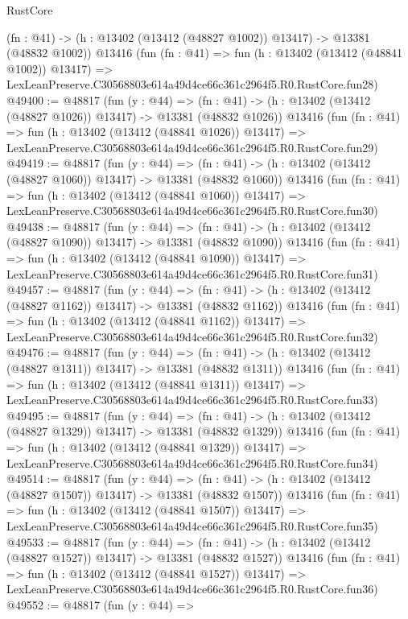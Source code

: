 \begin{lexlean}{RustCore}
\begin{coremodule}
    (fn : @41) -> (h : @13402 (@13412 (@48827 @1002)) @13417) -> @13381 (@48832 @1002))
    @13416
    (fun (fn : @41) =>
    fun (h : @13402 (@13412 (@48841 @1002)) @13417) =>
    LexLeanPreserve.C30568803e614a49d4ce66c361c2964f5.R0.RustCore.fun28)
@49400 := @48817
    (fun (y : @44) =>
    (fn : @41) -> (h : @13402 (@13412 (@48827 @1026)) @13417) -> @13381 (@48832 @1026))
    @13416
    (fun (fn : @41) =>
    fun (h : @13402 (@13412 (@48841 @1026)) @13417) =>
    LexLeanPreserve.C30568803e614a49d4ce66c361c2964f5.R0.RustCore.fun29)
@49419 := @48817
    (fun (y : @44) =>
    (fn : @41) -> (h : @13402 (@13412 (@48827 @1060)) @13417) -> @13381 (@48832 @1060))
    @13416
    (fun (fn : @41) =>
    fun (h : @13402 (@13412 (@48841 @1060)) @13417) =>
    LexLeanPreserve.C30568803e614a49d4ce66c361c2964f5.R0.RustCore.fun30)
@49438 := @48817
    (fun (y : @44) =>
    (fn : @41) -> (h : @13402 (@13412 (@48827 @1090)) @13417) -> @13381 (@48832 @1090))
    @13416
    (fun (fn : @41) =>
    fun (h : @13402 (@13412 (@48841 @1090)) @13417) =>
    LexLeanPreserve.C30568803e614a49d4ce66c361c2964f5.R0.RustCore.fun31)
@49457 := @48817
    (fun (y : @44) =>
    (fn : @41) -> (h : @13402 (@13412 (@48827 @1162)) @13417) -> @13381 (@48832 @1162))
    @13416
    (fun (fn : @41) =>
    fun (h : @13402 (@13412 (@48841 @1162)) @13417) =>
    LexLeanPreserve.C30568803e614a49d4ce66c361c2964f5.R0.RustCore.fun32)
@49476 := @48817
    (fun (y : @44) =>
    (fn : @41) -> (h : @13402 (@13412 (@48827 @1311)) @13417) -> @13381 (@48832 @1311))
    @13416
    (fun (fn : @41) =>
    fun (h : @13402 (@13412 (@48841 @1311)) @13417) =>
    LexLeanPreserve.C30568803e614a49d4ce66c361c2964f5.R0.RustCore.fun33)
@49495 := @48817
    (fun (y : @44) =>
    (fn : @41) -> (h : @13402 (@13412 (@48827 @1329)) @13417) -> @13381 (@48832 @1329))
    @13416
    (fun (fn : @41) =>
    fun (h : @13402 (@13412 (@48841 @1329)) @13417) =>
    LexLeanPreserve.C30568803e614a49d4ce66c361c2964f5.R0.RustCore.fun34)
@49514 := @48817
    (fun (y : @44) =>
    (fn : @41) -> (h : @13402 (@13412 (@48827 @1507)) @13417) -> @13381 (@48832 @1507))
    @13416
    (fun (fn : @41) =>
    fun (h : @13402 (@13412 (@48841 @1507)) @13417) =>
    LexLeanPreserve.C30568803e614a49d4ce66c361c2964f5.R0.RustCore.fun35)
@49533 := @48817
    (fun (y : @44) =>
    (fn : @41) -> (h : @13402 (@13412 (@48827 @1527)) @13417) -> @13381 (@48832 @1527))
    @13416
    (fun (fn : @41) =>
    fun (h : @13402 (@13412 (@48841 @1527)) @13417) =>
    LexLeanPreserve.C30568803e614a49d4ce66c361c2964f5.R0.RustCore.fun36)
@49552 := @48817
    (fun (y : @44) =>

\end{coremodule}
\end{lexlean}
